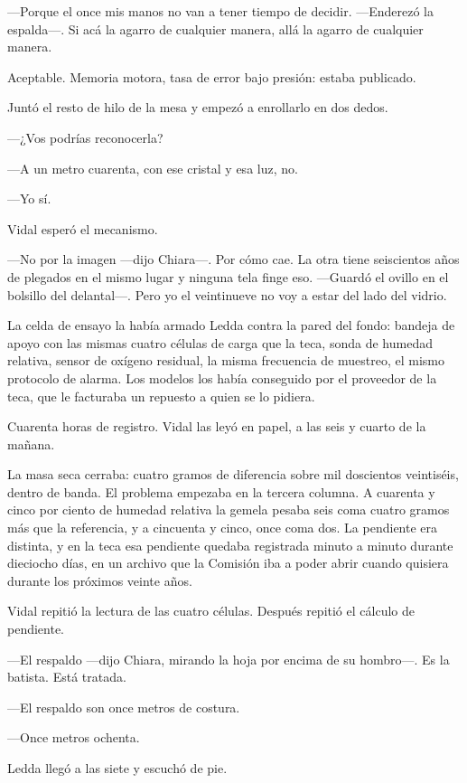 ---Porque el once mis manos no van a tener tiempo de decidir. ---Enderezó la espalda---. Si acá la agarro de cualquier manera, allá la agarro de cualquier manera.

Aceptable. Memoria motora, tasa de error bajo presión: estaba publicado.

Juntó el resto de hilo de la mesa y empezó a enrollarlo en dos dedos.

---¿Vos podrías reconocerla?

---A un metro cuarenta, con ese cristal y esa luz, no.

---Yo sí.

Vidal esperó el mecanismo.

---No por la imagen ---dijo Chiara---. Por cómo cae. La otra tiene seiscientos años de plegados en el mismo lugar y ninguna tela finge eso. ---Guardó el ovillo en el bolsillo del delantal---. Pero yo el veintinueve no voy a estar del lado del vidrio.


\scenebreak


La celda de ensayo la había armado Ledda contra la pared del fondo: bandeja de apoyo con las mismas cuatro células de carga que la teca, sonda de humedad relativa, sensor de oxígeno residual, la misma frecuencia de muestreo, el mismo protocolo de alarma. Los modelos los había conseguido por el proveedor de la teca, que le facturaba un repuesto a quien se lo pidiera.

Cuarenta horas de registro. Vidal las leyó en papel, a las seis y cuarto de la mañana.

La masa seca cerraba: cuatro gramos de diferencia sobre mil doscientos veintiséis, dentro de banda. El problema empezaba en la tercera columna. A cuarenta y cinco por ciento de humedad relativa la gemela pesaba seis coma cuatro gramos más que la referencia, y a cincuenta y cinco, once coma dos. La pendiente era distinta, y en la teca esa pendiente quedaba registrada minuto a minuto durante dieciocho días, en un archivo que la Comisión iba a poder abrir cuando quisiera durante los próximos veinte años.

Vidal repitió la lectura de las cuatro células. Después repitió el cálculo de pendiente.

---El respaldo ---dijo Chiara, mirando la hoja por encima de su hombro---. Es la batista. Está tratada.

---El respaldo son once metros de costura.

---Once metros ochenta.

Ledda llegó a las siete y escuchó de pie.

